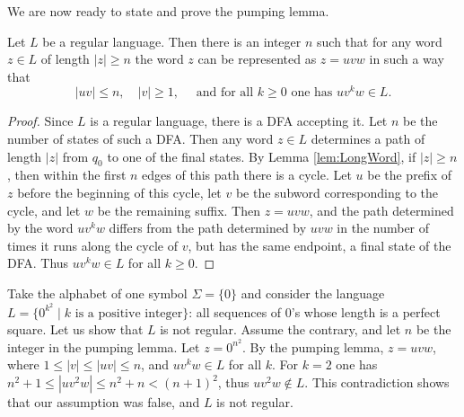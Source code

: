 \begin{page}


We are now ready to state and prove the pumping lemma.


\end{page}

\begin{page}

\begin{thm}
Let $L$ be a regular language.
Then there is an integer $n$ such that for any word $z \in L$ of length $|z| \ge n$ the word $z$ can be represented as $z = uvw$ in such a way that
\[
|uv| \le n, \quad |v| \ge 1, \quad \text{ and for all }k \ge 0 \text{ one has } uv^kw \in L.
\]
\end{thm}

\end{page}

\begin{page}

\begin{proof}
Since $L$ is a regular language, there is a DFA accepting it.
Let $n$ be the number of states of such a DFA.
Then any word $z \in L$ determines a path of length $|z|$ from $q_0$ to one of the final states.
By Lemma \ref{lem:LongWord}, if $|z| \ge n$, then within the first $n$ edges of this path there is a cycle.
Let $u$ be the prefix of $z$ before the beginning of this cycle, let $v$ be the subword corresponding to the cycle, and let $w$ be the remaining suffix.
Then $z = uvw$, and the path determined by the word $uv^kw$ differs from the path determined by $uvw$ in the number of times it runs along the cycle of $v$,
but has the same endpoint, a final state of the DFA.
Thus $uv^kw \in L$ for all $k \ge 0$.
\end{proof}


\end{page}

\begin{page}

\begin{exl}
Take the alphabet of one symbol $\Sigma = \{0\}$
and consider the language $L = \{0^{k^2} \mid k \text{ is a positive integer}\}$:
all sequences of $0$'s whose length is a perfect square.
Let us show that $L$ is not regular. Assume the contrary, and let $n$ be the integer in the pumping lemma.
Let $z = 0^{n^2}$. By the pumping lemma, $z = uvw$, where $1 \le |v| \le |uv| \le n$, and $uv^kw \in L$ for all $k$.
For $k=2$ one has $n^2+1 \le |uv^2w| \le n^2 + n < (n+1)^2$, thus $uv^2w \notin L$.
This contradiction shows that our assumption was false, and $L$ is not regular.
\end{exl}

\end{page}

